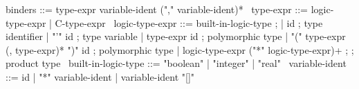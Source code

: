 \begin{syntax}
  binders ::= type-expr variable-ident ("," variable-ident)*
  \
  type-expr ::= logic-type-expr | C-type-expr
  \
  logic-type-expr ::= built-in-logic-type ;
  | id ; type identifier
  | "'" id ; type variable
  | type-expr id ; polymorphic type                 
  | "(" type-expr (, type-expr)* ")" id ; polymorphic type
  | logic-type-expr ("*" logic-type-expr)+  ; \experimental 
  ; product type 
  \
  built-in-logic-type ::= "boolean" | "integer" | "real" 
  \
  variable-ident ::= id 
  | "*" variable-ident 
  | variable-ident "[]"
\end{syntax}